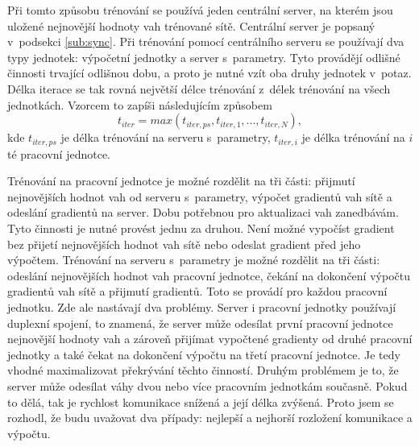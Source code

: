 Při tomto způsobu trénování se používá jeden centrální server, na kterém jsou uložené nejnovější hodnoty vah trénované sítě.
Centrální server je popsaný v~podsekci \ref{sub:sync}.
Při trénování pomocí centrálního serveru se používají dva typy jednotek: výpočetní jednotky a server s~parametry.
Tyto provádějí odlišné činnosti trvající odlišnou dobu, a proto je nutné vzít oba druhy jednotek v~potaz.
Délka iterace se tak rovná největší délce trénování z~délek trénování na všech jednotkách.
Vzorcem to zapíši následujícím způsobem \begin{equation}t_{iter}=max(t_{iter,ps},t_{iter,1}, ..., t_{iter,N}),\label{eq:est_sync_iter}\end{equation} kde $t_{iter,ps}$ je délka trénování na serveru s~parametry, $t_{iter,i}$ je délka trénování na $i$té pracovní jednotce.

Trénování na pracovní jednotce je možné rozdělit na tři části: přijmutí nejnovějších hodnot vah od serveru s~parametry, výpočet gradientů vah sítě a odeslání gradientů na server.
Dobu potřebnou pro aktualizaci vah zanedbávám.
Tyto činnosti je nutné provést jednu za druhou.
Není možné vypočíst gradient bez přijetí nejnovějších hodnot vah sítě nebo odeslat gradient před jeho výpočtem.
Trénování na serveru s~parametry je možné rozdělit na tři části: odeslání nejnovějších hodnot vah pracovní jednotce, čekání na dokončení výpočtu gradientů vah sítě a přijmutí gradientů.
Toto se provádí pro každou pracovní jednotku.
Zde ale nastávají dva problémy.
Server i pracovní jednotky používají duplexní spojení, to znamená, že server může odesílat první pracovní jednotce nejnovější hodnoty vah a zároveň přijímat vypočtené gradienty od druhé pracovní jednotky a také čekat na dokončení výpočtu na třetí pracovní jednotce.
Je tedy vhodné maximalizovat překrývání těchto činností.
Druhým problémem je to, že server může odesílat váhy dvou nebo více pracovním jednotkám současně.
Pokud to dělá, tak je rychlost komunikace snížená a její délka zvýšená.
Proto jsem se rozhodl, že budu uvažovat dva případy: nejlepší a nejhorší rozložení komunikace a výpočtu.

